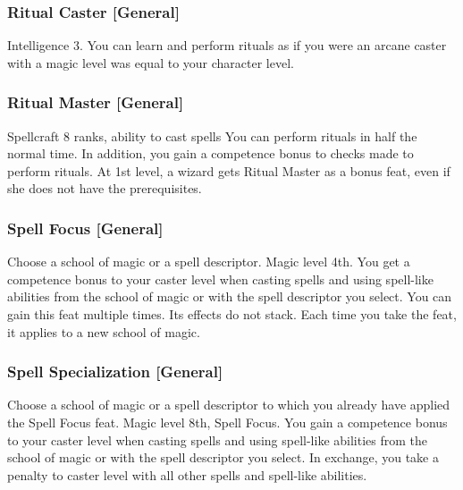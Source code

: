 \subsubsection{Ritual Caster [General]}
\featpre Intelligence 3.
\featben You can learn and perform rituals as if you were an arcane caster with a magic level was equal to your character level.

\subsubsection{Ritual Master [General]}
 Spellcraft 8 ranks, ability to cast spells
 You can perform rituals in half the normal time. In addition, you gain a  competence bonus to checks made to perform rituals.
 At 1st level, a wizard gets Ritual Master as a bonus feat, even if she does not have the prerequisites.

\subsubsection{Spell Focus [General]}
Choose a school of magic or a spell descriptor.
 Magic level 4th.
 You get a  competence bonus to your caster level when casting spells and using spell-like abilities from the school of magic or with the spell descriptor you select.
 You can gain this feat multiple times. Its effects do not stack. Each time you take the feat, it applies to a new school of magic.

\subsubsection{Spell Specialization [General]}
Choose a school of magic or a spell descriptor to which you already have applied the Spell Focus feat.
\featpre Magic level 8th, Spell Focus.
\featben You gain a  competence bonus to your caster level when casting spells and using spell-like abilities from the school of magic or with the spell descriptor you select. In exchange, you take a  penalty to caster level with all other spells and spell-like abilities.


